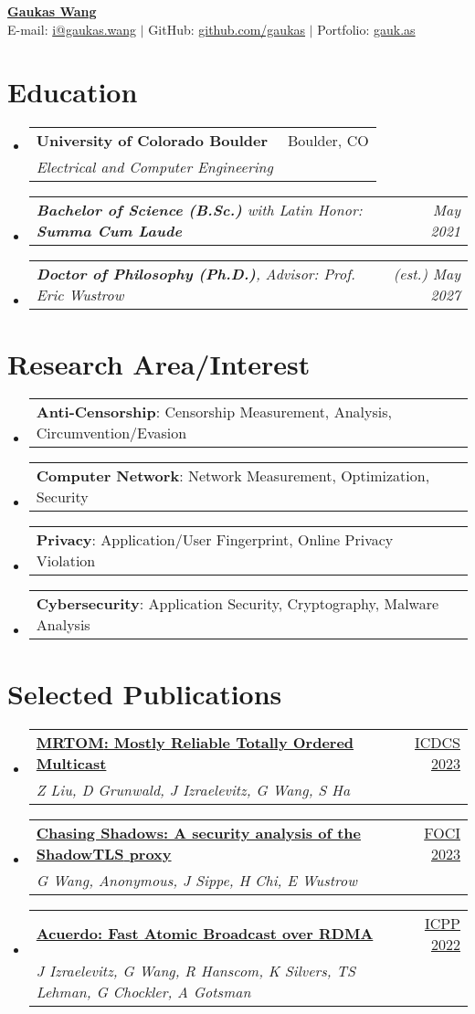 \documentclass[letterpaper,11pt]{article}
\makeatletter
\newcommand{\resumeSubheading}[4]{
  \vspace{-2pt}\item
    \begin{tabular*}{0.97\textwidth}[t]{l@{\extracolsep{\fill}}r}
      \textbf{#1} & #2 \\
      \textit{\small#3} & \textit{\small #4} \\
    \end{tabular*}\vspace{-7pt}
}
\newcommand{\resumeSubSubheading}[2]{
    \item
    \begin{tabular*}{0.97\textwidth}{l@{\extracolsep{\fill}}r}
      \textit{\small#1} & \textit{\small #2} \\
    \end{tabular*}\vspace{-7pt}
}
\newcommand{\resumeProjectHeading}[2]{
    \item
    \begin{tabular*}{0.97\textwidth}{l@{\extracolsep{\fill}}r}
      \small#1 & #2 \\
    \end{tabular*}\vspace{-7pt}
}
\newcommand{\resumeSubHeadingListStart}{\begin{itemize}[leftmargin=0.15in, label={}]}
\newcommand{\resumeSubHeadingListEnd}{\end{itemize}}
\makeatother
\begin{document}
\begin{center}
  \href{https://gaukas.wang}{\textbf{\Huge Gaukas Wang}} \\ \vspace{1pt}
    E-mail: \href{mailto:i@gaukas.wang}{{i@gaukas.wang}} $|$ 
    GitHub: \href{https://github.com/gaukas}{{github.com/gaukas}} $|$ 
    Portfolio: \href{https://gauk.as}{gauk.as}
\end{center}


\section{Education}
\resumeSubHeadingListStart
\resumeSubheading
{University of Colorado Boulder}{Boulder, CO}
{Electrical and Computer Engineering}{}
\resumeSubSubheading
{\textbf{Bachelor of Science (B.Sc.)} \em{with Latin Honor: \textbf{Summa Cum Laude}}}{May 2021}
\resumeSubSubheading
{\textbf{Doctor of Philosophy (Ph.D.)}, {Advisor: Prof. Eric Wustrow}}{\textit{(est.)} May 2027}
\resumeSubHeadingListEnd

\vspace{1pt}

\section{Research Area/Interest}
\resumeSubHeadingListStart
  \resumeProjectHeading {\textbf{Anti-Censorship}: Censorship Measurement, Analysis, Circumvention/Evasion}{}
  \resumeProjectHeading {\textbf{Computer Network}: Network Measurement, Optimization, Security}{}
  \resumeProjectHeading {\textbf{Privacy}: Application/User Fingerprint, Online Privacy Violation}{}
  \resumeProjectHeading {\textbf{Cybersecurity}: Application Security, Cryptography, Malware Analysis}{}
\resumeSubHeadingListEnd
\vspace{1pt}

\section{Selected Publications}
\resumeSubHeadingListStart
  \resumeSubheading
  {\href{https://ieeexplore.ieee.org/document/10272412}{\textbf{{MRTOM}: Mostly Reliable Totally Ordered Multicast}}}{\href{https://icdcs2023.icdcs.org/}{ICDCS 2023}}
  {Z Liu, D Grunwald, J Izraelevitz, G Wang, S Ha}{}
  \resumeSubheading
  {\href{https://www.petsymposium.org/foci/2023/foci-2023-0002.php}{\textbf{{Chasing Shadows}: A security analysis of the {ShadowTLS} proxy}}}{\href{https://foci.community/foci23.html}{FOCI 2023}}
  {G Wang, Anonymous, J Sippe, H Chi, E Wustrow}{}
  \resumeSubheading
  {\href{https://dl.acm.org/doi/abs/10.1145/3545008.3545041}{\textbf{Acuerdo: Fast Atomic Broadcast over {RDMA}}}}{\href{https://icpp22.gitlabpages.inria.fr/}{ICPP 2022}}
  {J Izraelevitz, G Wang, R Hanscom, K Silvers, TS Lehman, G Chockler, A Gotsman}{}
\resumeSubHeadingListEnd
\vspace{1pt}
\end{document}
